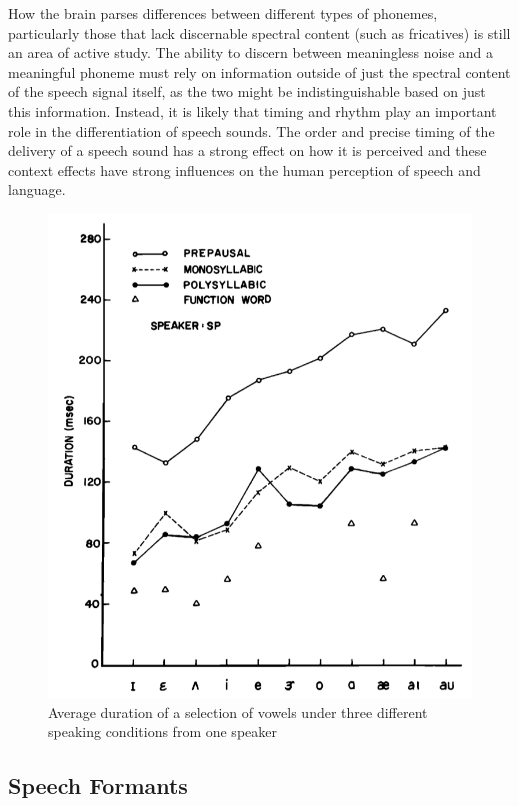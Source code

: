 \documentclass[titlepage]{article}
\begin{document}
    How the brain parses differences between different types of phonemes, particularly
    those that lack discernable spectral content (such as fricatives) is still an area
    of active study. The ability to discern between meaningless noise and a meaningful
    phoneme must rely on information outside of just the spectral content of the
    speech signal itself, as the two might be indistinguishable based on just this information.
    Instead, it is likely that timing and rhythm play an important role in the differentiation
    of speech sounds. The order and precise timing of the delivery of a speech sound has a
    strong effect on how it is perceived and these context effects have strong influences on
    the human perception of speech and language.


    \begin{figure}
      \centering
      \includegraphics[scale=0.3]{vowelDuration}
      \caption{Average duration of a selection of vowels under three different
      speaking conditions from one speaker \cite{Umeda1975}}
      \label{vowelDuration}
    \end{figure}

  \subsection{Speech Formants}
\end{document}
